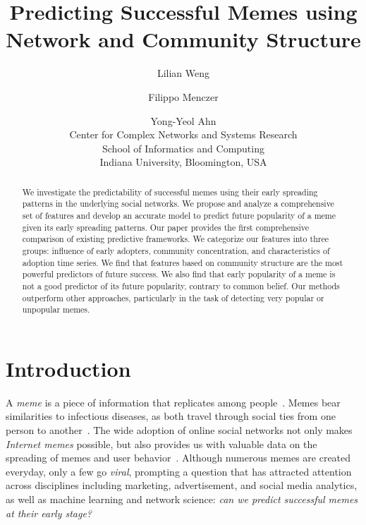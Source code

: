 \documentclass[letterpaper]{article}
\begin{document}
\title{Predicting Successful Memes using Network and Community Structure}

\author{
Lilian Weng \and Filippo Menczer \and Yong-Yeol Ahn\\
Center for Complex Networks and Systems Research\\
School of Informatics and Computing\\
Indiana University, Bloomington, USA\\
}

\maketitle

\begin{abstract}

We investigate the predictability of successful memes using their early spreading patterns in the underlying social networks. We propose and analyze a comprehensive set of features and develop an accurate model to predict future popularity of a meme given its early spreading patterns. Our paper provides the first comprehensive comparison of existing predictive frameworks. We categorize our features into three groups: influence of early adopters, community concentration, and characteristics of adoption time series. We find that features based on community structure are the most powerful predictors of future success. We also find that early popularity of a meme is not a good predictor of its future popularity, contrary to common belief. Our methods outperform other approaches, particularly in the task of detecting very popular or unpopular memes.

\end{abstract}



\section{Introduction}


A \emph{meme} is a piece of information that replicates among people~\cite{meme}. Memes bear  similarities to infectious diseases, as both travel through social ties from one person to another~\cite{daley_epidemics_1964,goffman1964nature}. The wide adoption of online social networks not only makes \emph{Internet memes} possible, but also provides us with valuable data on the spreading of memes and user behavior~\cite{Vespignani2009,Lazer2009}.
Although numerous memes are created everyday, only a few go \emph{viral}, prompting a question that has attracted attention across disciplines including marketing, advertisement, and social media analytics, as well as machine learning and network science: \emph{can we predict successful memes at their early stage?}
\end{document}
